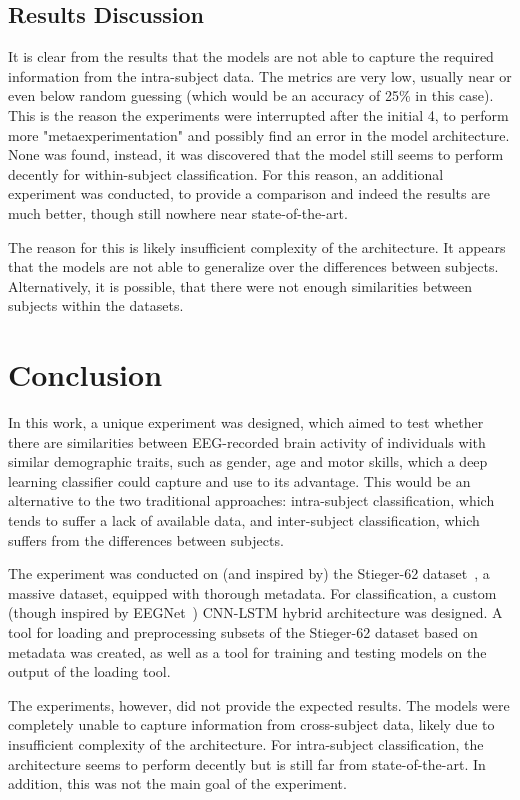 \documentclass[english, he, bc, kiv, iso690alph, viewonly]{fasthesis}
\begin{document}
\section{Results Discussion}
\label{sec:disc}

It is clear from the results that the models are not able to capture the required information from the intra-subject data. The metrics are very low, usually near or even below random guessing (which would be an accuracy of 25\% in this case). This is the reason the experiments were interrupted after the initial 4, to perform more "metaexperimentation" and possibly find an error in the model architecture. None was found, instead, it was discovered that the model still seems to perform decently for within-subject classification. For this reason, an additional experiment was conducted, to provide a comparison and indeed the results are much better, though still nowhere near state-of-the-art.

The reason for this is likely insufficient complexity of the architecture. It appears that the models are not able to generalize over the differences between subjects. Alternatively, it is possible, that there were not enough similarities between subjects within the datasets.

\chapter{Conclusion}

In this work, a unique experiment was designed, which aimed to test whether there are similarities between EEG-recorded brain activity of individuals with similar demographic traits, such as gender, age and motor skills, which a deep learning classifier could capture and use to its advantage. This would be an alternative to the two traditional approaches: intra-subject classification, which tends to suffer a lack of available data, and inter-subject classification, which suffers from the differences between subjects.

The experiment was conducted on (and inspired by) the Stieger-62 dataset~\cite{data:stieger:21}, a massive dataset, equipped with thorough metadata. For classification, a custom (though inspired by EEGNet~\cite{lawhern:eegnet:18}) CNN-LSTM hybrid architecture was designed. A tool for loading and preprocessing subsets of the Stieger-62 dataset based on metadata was created, as well as a tool for training and testing models on the output of the loading tool.

The experiments, however, did not provide the expected results. The models were completely unable to capture information from cross-subject data, likely due to insufficient complexity of the architecture. For intra-subject classification, the architecture seems to perform decently but is still far from state-of-the-art. In addition, this was not the main goal of the experiment.
\end{document}
